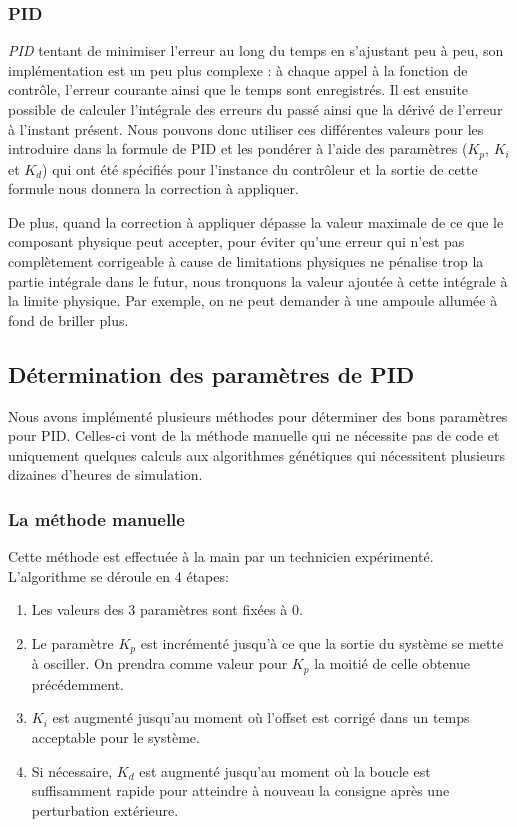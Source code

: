 \documentclass[a4paper,10pt]{report}
\begin{document}
\subsubsection{PID}

\emph{PID} tentant de minimiser l'erreur au long du temps en s'ajustant peu à peu, son implémentation est un peu plus complexe : à chaque appel à la fonction de contrôle, l'erreur courante ainsi que le temps sont enregistrés.
Il est ensuite possible de calculer l'intégrale des erreurs du passé ainsi que la dérivé de l'erreur à l'instant présent.
Nous pouvons donc utiliser ces différentes valeurs pour les introduire dans la formule de PID et les pondérer à l'aide des paramètres ($K_p$, $K_i$ et $K_d$) qui ont été spécifiés pour l'instance du contrôleur et la sortie de cette formule nous donnera la correction à appliquer.

De plus, quand la correction à appliquer dépasse la valeur maximale de ce que le composant physique peut accepter, pour éviter qu'une erreur qui n'est pas complètement corrigeable à cause de limitations physiques ne pénalise trop la partie intégrale dans le futur, nous tronquons la valeur ajoutée à cette intégrale à la limite physique. Par exemple, on ne peut demander à une ampoule allumée à fond de briller plus.

\subsection{Détermination des paramètres de PID}

Nous avons implémenté plusieurs méthodes pour déterminer des bons paramètres pour PID. Celles-ci vont de la méthode manuelle qui ne nécessite pas de code et uniquement quelques calculs aux algorithmes génétiques qui nécessitent plusieurs dizaines d'heures de simulation.

\subsubsection{La méthode manuelle}

Cette méthode est effectuée à la main par un technicien expérimenté.
L'algorithme se déroule en 4 étapes:
\begin{enumerate}
    \item Les valeurs des 3 paramètres sont fixées à $0$.
    \item Le paramètre $K_p$ est incrémenté jusqu'à ce que la sortie du système se mette à osciller.
    On prendra comme valeur pour $K_p$ la moitié de celle obtenue précédemment.
    \item $K_i$ est augmenté jusqu'au moment où l'offset est corrigé dans un temps acceptable pour le système.
    \item Si nécessaire, $K_d$ est augmenté jusqu'au moment où la boucle est suffisamment rapide pour atteindre à nouveau la consigne après une perturbation extérieure.
\end{enumerate}
\end{document}
